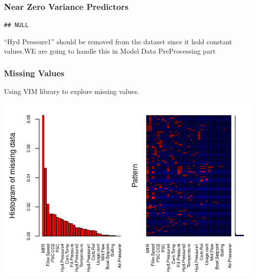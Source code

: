 \documentclass[]{article}
\begin{document}
\subsubsection{Near Zero Variance
Predictors}\label{near-zero-variance-predictors}

\begin{verbatim}
## NULL
\end{verbatim}

``Hyd Pressure1'' should be removed from the dataset since it hold
constant values.WE are going to handle this in Model Data PreProcessing
part

\subsubsection{Missing Values}\label{missing-values}

Using VIM library to explore missing values.

\begin{center}\includegraphics{OmerOzeren_GracieHan_Project_2_files/figure-latex/unnamed-chunk-14-1} \end{center}
\end{document}
